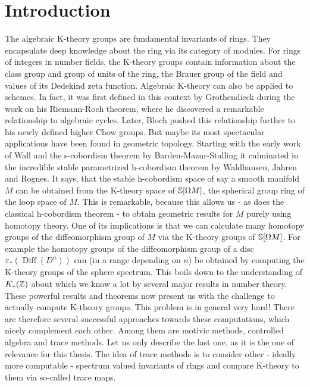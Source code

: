 \chapter{Introduction}

The algebraic K-theory groups are fundamental invariants of rings. 
They encapsulate deep knowledge about the ring via its category of modules.
For rings of integers in number fields, the K-theory groups contain information about the class group and group of units of the ring, the Brauer group of the field and values of its Dedekind zeta function.
Algebraic K-theory can also be applied to schemes. In fact, it was first defined in this context by Grothendieck during the work on his Riemann-Roch theorem, where he discovered a remarkable relationship to algebraic cycles.
Later, Bloch pushed this relationship further to his newly defined higher Chow groups.
But maybe its most spectacular applications have been found in geometric topology.
Starting with the early work of Wall and the s-cobordism theorem by Barden-Mazur-Stalling it culminated in the incredible stable parametrized h-cobordism theorem by Waldhausen, Jahren and Rognes. It says, that the stable h-cobordism space of say a smooth manifold $M$ can be obtained from the K-theory space of $\S[\Omega M]$, the spherical group ring of the loop space of $M$.
This is remarkable, because this allows us - as does the classical h-cobordism theorem - to obtain geometric results for $M$ purely using homotopy theory.
One of its implications is that we can calculate many homotopy groups of the diffeomorphism group of $M$ via the K-theory groups of $\S[\Omega M]$.
For example the homotopy groups of the diffeomorphism group of a disc $\pi_* (\operatorname{Diff}(D^n))$ can (in a range depending on $n$) be obtained by computing the K-theory groups of the sphere spectrum. This boils down to the understanding of $K_*(\Z)$ about which we know a lot by several major results in number theory.
\\
These powerful results and theorems now present us with the challenge to actually compute K-theory groups. 
This problem is in general very hard! 
There are therefore several successful approaches towards these computations, which nicely complement each other. Among them are motivic methods, controlled algebra and trace methods. 
Let us only describe the last one, as it is the one of relevance for this thesis.
The idea of trace methods is to consider other - ideally more computable - spectrum valued invariants of rings and compare K-theory to them via so-called trace maps. 

